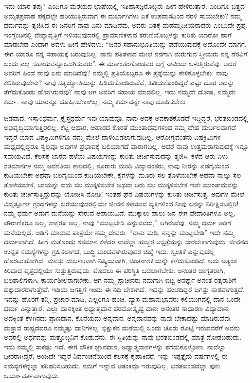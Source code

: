 ಇದು ಯಾರ ತಪ್ಪು? ಎಂದಿಗೂ ಮರೆಯದ ಭಾಷೆಯಲ್ಲಿ ಇತಿಹಾಸಜ್ಞ\-ರೊಬ್ಬರು ಹೀಗೆ ಹೇಳಿರುತ್ತಾರೆ: ಎಂದಿಗೂ ಬತ್ತದ ಅಮೃತಪ್ರವಾಹ ಪಕ್ಕದಲ್ಲೇ ಹರಿಯುತ್ತಿರುವಾಗ ಈ ದುರ್ಭಾಗಿಗಳು ಏಕೆ ಉಪವಾಸದಿಂದ ನರಳಿ ಸಾಯಬೇಕು? ನಮ್ಮ ಧರ್ಮವನ್ನು ತ್ಯಜಿಸಿದ ಈ ಜನರಿಗೆ ನಾವು ಏನು ಮಾಡಿದೆವು, ಅವರು ಏತಕ್ಕೆ ಮಹಮ್ಮದೀಯರಾದರು ಎಂಬುದೇ ಪ್ರಶ್ನೆ. ಇಂಗ್ಲೆಂಡಿನಲ್ಲಿ ವೇಶ್ಯಾವೃತ್ತಿಗೆ ಇಳಿಯುವುದರಲ್ಲಿ ಪ್ರಾಮಾಣಿಕಳಾದ ತರುಣಿಯೊಬ್ಬಳನ್ನು ಕುರಿತು ಯಾರೋ ಹಾಗೆ ಮಾಡಬೇಡ ಎಂದಾಗ ಅವಳು ಹೀಗೆ ಹೇಳಿದಳು: “ಜನರ ಸಹಾನುಭೂತಿಯನ್ನು ಪಡೆಯುವುದಕ್ಕೆ ಅದೊಂದೇ ಮಾರ್ಗ. ಈಗ ಯಾರೂ ನನ್ನ ಸಹಾಯಕ್ಕೆ ಬರುವುದಿಲ್ಲ. ನಾನು ಪತಿತಳಾದ ಮೇಲೆ ನನಗಾಗಿ ಮರುಗುವ ಸ್ತ್ರೀಯರು ನನ್ನ ನೆರವಿಗೆ ಬಂದು ಎಲ್ಲ ಸಹಾಯವನ್ನೂ\break ಒದಗಿಸುವರು”. ಈ ಮತಾಂತರಗೊಂಡವರ ಬಗ್ಗೆ ನಾವಿಂದು ಅಳುತ್ತಿರುವೆವು. ಆದರೆ ಅವರಿಗೆ ಹಿಂದೆ ನಾವು ಏನು ಮಾಡಿದೆವು? ನಮ್ಮಲ್ಲಿ ಪ್ರತಿಯೊಬ್ಬರೂ ಈ ಪ್ರಶ್ನೆಯನ್ನು ಕೇಳಿಕೊಳ್ಳಬೇಕು: ನಾವು ಕಲಿತಿರುವುದೇನು? ನಾವು ಸತ್ಯ\-ಜ್ಯೋತಿಯನ್ನು ಹಿಡಿದುಕೊಂಡಿರುವೆವೆ, ಹಿಡಿದುಕೊಂಡಿದ್ದರೆ ಎಷ್ಟು ದೂರ ಅದನ್ನು ತೆಗೆದುಕೊಂಡು ಹೋಗಿರುವೆವು? ನಾವು ಆಗ ಅವರಿಗೆ ಸಹಾಯ ಮಾಡಲಿಲ್ಲ. ಇದು ನಮ್ಮದೇ ದೋಷ, ನಮ್ಮದೇ ಕರ್ಮ. ನಾವು ಯಾರನ್ನೂ ದೂಷಿಸಬೇಕಾಗಿಲ್ಲ, ನಮ್ಮ ಕರ್ಮವನ್ನೇ ನಾವು ದೂಷಿಸಬೇಕು.

ಜಡವಾದ, ಇಸ್ಲಾಂಧರ್ಮ, ಕ್ರೈಸ್ತಧರ್ಮ ಇವು ಯಾವುವೂ, ನಾವು ಅವಕ್ಕೆ ಅವಕಾಶಕೊಡದೆ ಇದ್ದಿದ್ದರೆ, ಭರತಖಂಡದಲ್ಲಿ ಅಭಿವೃದ್ಧಿಯಾಗುತ್ತಿರಲಿಲ್ಲ. ಕೆಟ್ಟ ಆಹಾರ, ಆಹಾರದ ಕೊರತೆ ಮುಂತಾದವುಗಳಿಂದ ನಮ್ಮ ದೇಹ ದುರ್ಬಲವಾಗದೆ ಇದ್ದರೆ ಯಾವ ವಿಷಕ್ರಿಮಿಗಳಿಗೂ ನಮ್ಮ ಮೇಲೆ ದಾಳಿಯಿಡಲಾಗುವುದಿಲ್ಲ. ಆರೋಗ್ಯವಂತನು ವಿಷಕ್ರಿಮಿಗಳ ಮಧ್ಯದಲ್ಲಿದ್ದರೂ ಸ್ವಲ್ಪವೂ ಅವುಗಳ ಪ್ರಭಾವಕ್ಕೆ ಬಲಿಯಾಗದೆ ಪಾರಾಗಬಲ್ಲ. ಆದರೆ ನಾವು ಉತ್ತಮರಾಗುವುದಕ್ಕೆ ಇನ್ನೂ ಸಮಯವಿದೆ. ಕೆಲಸಕ್ಕೆ ಬಾರದ ಹಳೆಯ ವಿಷಯಗಳನ್ನು ಕುರಿತು ಚರ್ಚಿಸುವುದನ್ನು ತ್ಯಜಿಸಿ. ಕಳೆದ ಆರು ಏಳು ಶತಮಾನಗಳ ನಮ್ಮ ಅವನತಿಯ ಕಾಲದಲ್ಲಿ, ನೂರಾರು ಮಂದಿ ವಿದ್ಯಾವಂತರು, ನಾವು ನೀರನ್ನು ಎಡಗೈಯಿಂದ ಕುಡಿಯಬೇಕೇ ಅಥವಾ ಬಲಗೈಯಿಂದ ಕುಡಿಯಬೇಕೇ, ಕೈಗಳನ್ನು ಮೂರು ಸಲ ತೊಳೆಯಬೇಕೆ ಅಥವಾ ನಾಲ್ಕು ಸಲ ತೊಳೆಯಬೇಕೆ, ಬಾಯನ್ನು ಐದು ಸಲ ಮುಕ್ಕಳಿಸಬೇಕೆ ಅಥವಾ ಆರು ಸಲ ಮುಕ್ಕಳಿಸಬೇಕೆ ಇವೇ ಮುಂತಾದುವನ್ನು ಕುರಿತು ಚರ್ಚಿಸುತ್ತಿದ್ದುದನ್ನು ಯೋಚಿಸಿ ನೋಡಿ! ಇಂತಹ ಘನ ವಿಷಯಗಳನ್ನು ಕುರಿತು ಚರ್ಚಿಸುತ್ತ, ಅವುಗಳ ಮೇಲೆ ವಿದ್ವತ್ಪೂರ್ಣ ಗ್ರಂಥಗಳನ್ನು ಬರೆಯುವುದರಲ್ಲಿಯೇ ಜೀವನ ಕಳೆಯುವ ವ್ಯಕ್ತಿಗಳಿಂದ ನೀವು ಏನನ್ನು ನಿರೀಕ್ಷಿಸ\-ಬಲ್ಲಿರಿ! ನಮ್ಮ ಧರ್ಮ ಅಡುಗೆ ಮನೆಯನ್ನು ಸೇರುವ ಅಪಾಯವಿದೆ. ಮುಕ್ಕಾಲು ಪಾಲು ಜನ ಈಗ ವೇದಾಂತಿಗಳೂ ಅಲ್ಲ, ಪೌರಾಣಿಕರೂ ಅಲ್ಲ, ಶಾಕ್ತರೂ ಅಲ್ಲ. ನಾವು “ಮುಟ್ಟಬೇಡಿ ಎನ್ನುವವರು,” ಆಗಿರುವೆವು. ನಮ್ಮ ಧರ್ಮ ಅಡಿಗೆ ಮನೆಯಲ್ಲಿದೆ. ಅಡಿಗೆ ಮಾಡುವ ಪಾತ್ರೆಯೇ ನಮ್ಮ ದೇವರು. “ನಾನು ಮಡಿ, ನನ್ನನ್ನು ಮುಟ್ಟಬೇಡಿ” ಇದೇ ನಮ್ಮ ಧರ್ಮವಾಗಿದೆ. ಹೀಗೆ ಮತ್ತೊಂದು ಶತಮಾನ ಕಳೆದರೆ ನಾವೆಲ್ಲಾ ಹುಚ್ಚರ ಆಸ್ಪತ್ರೆಯನ್ನು ಸೇರಬೇಕಾಗುವುದು. ಜೀವನದ ಉನ್ನತ ಸಮಸ್ಯೆಗಳನ್ನು ಗ್ರಹಿಸಲಾಗದ, ಬುದ್ಧಿ ಮಂದವಾಗಿರುವುದರ ಚಿಹ್ನೆ ಇದು. ಸ್ವಂತಿಕೆ ಎನ್ನುವುದೆಲ್ಲ ಹೊರಟುಹೋಗಿದೆ. ಮನಸ್ಸು ದುರ್ಬಲವಾಗಿ ನಿಷ್ಕ್ರಿಯವಾಗಿ, ಚಿಂತನಾಶಕ್ತಿಯನ್ನೇ ಕಳೆದುಕೊಂಡಿದೆ. ಅದು ಅತ್ಯಂತ ಕಿರಿದಾದ ವೃತ್ತದಲ್ಲಿಯೇ ಸುತ್ತುತ್ತಿರುವುದು. ಮೊದಲು ಈ ಪರಿಸ್ಥಿತಿ ಬದಲಾಗಬೇಕು. ಅನಂತರ ಜಾಗೃತರಾಗಿ, ಬಲಶಾಲಿಗಳಾಗಿ, ಕಾರ್ಯಶೀಲರಾಗಬೇಕು. ಆಗ ನಮ್ಮ ಪ್ರಾಚೀನರು ನಮಗಾಗಿ ಬಿಟ್ಟ ಅನರ್ಘ್ಯ ಅನಂತ ರತ್ನರಾಶಿಗೆ ಹಕ್ಕುದಾರರಾಗುತ್ತೇವೆ. ಇಡಿಯ ಜಗತ್ತಿಗೆ ಇಂದು ಈ ನಿಧಿ ಬೇಕಾಗಿದೆ. ಇದನ್ನು ಹಂಚದಿದ್ದರೆ ಜಗತ್ತು ನಾಶವಾಗುತ್ತದೆ. ಇದನ್ನು ಹೊರಗೆ ತನ್ನಿ, ಪ್ರಚಾರ ಮಾಡಿ, ಎಲ್ಲರಿಗೂ ಹಂಚಿ. ವ್ಯಾಸ ಮಹಾನುಭಾವರು ಕಲಿಯುಗದಲ್ಲಿ ದಾನ ಒಂದೇ ಧರ್ಮ ಎನ್ನುತ್ತಾರೆ. ಎಲ್ಲಾ ದಾನಕ್ಕಿಂತ ಅಧ್ಯಾತ್ಮದಾನ ಪರಮೋತ್ಕೃಷ್ಟ ದಾನ; ಅನಂತರ ಸಾಧಾರಣ ವಿದ್ಯಾದಾನ; ಅದಕ್ಕಿಂತ ಕೆಳಗಿನದು ಪ್ರಾಣದಾನ, ಕೊನೆಯದು ಅನ್ನದಾನ. ಅನ್ನದಾನವನ್ನು ನಾವು ಬೇಕಾದಷ್ಟು ಮಾಡಿರುವೆವು. ಮತ್ತಾವ ರಾಷ್ಟ್ರದವರೂ ನಮ್ಮಷ್ಟು ದಾನಿಗಳಲ್ಲ. ಭಿಕ್ಷುಕನ ಮನೆಯಲ್ಲಿ ಒಂದು ಚೂರು ರೊಟ್ಟಿ ಇರುವವರೆಗೆ ಅವನು ಅದರಲ್ಲಿ ಅರ್ಧವನ್ನು ಮತ್ತೊಬ್ಬನಿಗೆ ಕೊಡುವನು. ಈ ಸ್ಥಿತಿಯನ್ನು ನಾವು ಭರತಖಂಡದಲ್ಲಿ ಮಾತ್ರ ನೋಡಬಹುದು. ಇದು ನಮ್ಮಲ್ಲಿ ಸಾಕಷ್ಟು ಇದೆ. ಈಗ ಲೌಕಿಕ ಜ್ಞಾನದಾನ, ಅಧ್ಯಾತ್ಮದಾನಗಳನ್ನು ತೆಗೆದುಕೊಳ್ಳೋಣ. ನಾವೆಲ್ಲಾ ಧೀರರಾಗಿದ್ದರೆ, ಅಂಜದೇ ಇದ್ದರೆ ನಿರ್ವಂಚನೆಯಿಂದ ಕೆಲಸಕ್ಕೆ ಕೈಹಾಕಿದರೆ, ಇನ್ನು ಇಪ್ಪತ್ತೈದು ವರ್ಷಗಳಲ್ಲಿ ಈ ಸಮಸ್ಯೆಗಳನ್ನೆಲ್ಲಾ ಪರಿಹರಿಸಬಹುದು. ನಮಗೆ ಇನ್ನಾವ ಆತಂಕವೂ ಇರುವುದಿಲ್ಲ. ಭರತಖಂಡವೆಲ್ಲಾ ಪುನಃ ಆರ್ಯಾವರ್ತವಾಗುವುದು.

